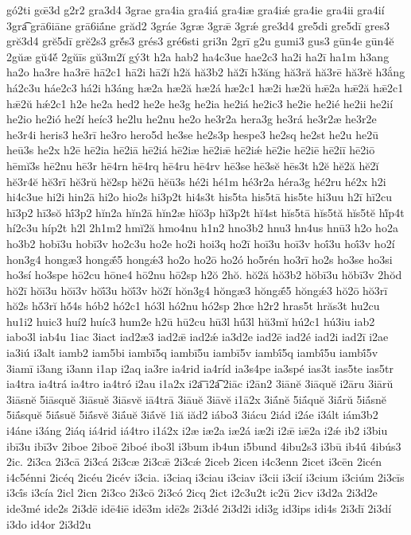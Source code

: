 {gó2ti
gœ̄3d
g2r2
gra3d4
3grae
gra4ia
gra4iá
gra4iæ
gra4iǽ
gra4ie
gra4ii
gra4ií
3gra͡
grā6iāne
grā6iā́ne
grăd2
3gráe
3græ
3grǣ
3grǽ
gre3d4
gre5di
gre5dī
gres3
grĕ3d4
grĕ5dī
grĕ2s3
grĕ́s3
grés3
gré6sti
gri3n
2grī
g2u
gumi3
gus3
gūn4e
gūn4ĕ
2gŭæ
gŭ4ĕ́
2gŭīs
gŭ3m2ĭ
gý3t
h2a
hab2
ha4c3ue
hae2c3
ha2i
ha2ī
ha1m
h3ang
ha2o
ha3re
ha3rē
hā2c1
hā2i
hā2ĭ
h2ă
hă3b2
hă2ī
h3ăng
hă3ră
hă3rē
hă3rĕ
h3ắng
há2c3u
háe2c3
há2i
h3áng
hæ2a
hæ2ă
hæ2á
hæ2c1
hæ2i
hæ2ŭ
hǣ2a
hǣ2ă
hǣ2c1
hǣ2ŭ
hǽ2c1
h2e
he2a
hed2
he2e
he3g
he2ia
he2iá
he2ic3
he2ie
he2ié
he2ii
he2ií
he2io
he2ió
he2í
heíc3
he2lu
he2nu
he2o
he3r2a
hera3g
he3rá
he3r2æ
he3r2e
he3r4i
heris3
he3rī
he3ro
hero5d
he3se
he2s3p
hespe3
he2sq
he2st
he2u
he2ū
heū3s
he2x
h2ē
hē2ia
hē2iā
hē2iá
hē2iæ
hē2iǣ
hē2iǽ
hē2ie
hē2iē
hē2iī
hē2iō
hēmĭ3s
hē2nu
hē3r
hē4rn
hē4rq
hē4ru
hē4rv
hē3se
hē3sĕ
hēs3t
h2ĕ
hĕ2ă
hĕ2ĭ
hĕ3r4ĕ
hĕ3rī
hĕ3rŭ
hĕ2sp
hĕ2ū
hĕū3s
hé2i
hé1m
hé3r2a
héra3g
hé2ru
hé2x
h2i
hi4c3ue
hi2i
hin2ā
hi2o
hio2s
hi3p2t
hi4s3t
his5ta
his5tā
his5te
hi3uu
h2ī
hī2cu
hī3p2
hī3sŏ
hī́3p2
hĭn2a
hĭn2ā
hĭn2æ
hĭŏ3p
hĭ3p2t
hĭ4st
hĭs5tā
hĭs5tă
hĭs5tĕ
hĭ́p4t
hí2c3u
híp2t
h2l
2h1m2
hmĭ2ă
hmo4nu
h1n2
hno3b2
hnu3
hn4us
hnū3
h2o
ho2a
ho3b2
hobī3u
hobī3v
ho2c3u
ho2e
ho2i
hoi3q
ho2ī
hoī3u
hoī3v
hoī́3u
hoī́3v
ho2í
hon3g4
hongæ3
hongǣ́5
hongǽ3
ho2o
ho2ō
ho2ó
ho5rén
ho3rī
ho2s
ho3se
ho3si
ho3sí
ho3spe
hō2cu
hōne4
hō2nu
hō2sp
h2ŏ
2hŏ.
hŏ2ă
hŏ3b2
hŏbī3u
hŏbī3v
2hŏd
hŏ2ī
hŏī3u
hŏī3v
hŏī́3u
hŏī́3v
hŏ2ĭ
hŏn3g4
hŏngæ3
hŏngǣ́5
hŏngǽ3
hŏ2ō
hŏ3rī
hŏ2s
hŏ́3rĭ
hŏ́4s
hób2
hó2c1
hó3l
hó2nu
hó2sp
2hœ
h2r2
hras5t
hrăs3t
hu2cu
hu1i2
huic3
huí2
huíc3
hum2e
h2ū
hū2cu
hū3l
hū́3l
hŭ3mĭ
hú2c1
hú3iu
iab2
iabo3l
iab4u
1iac
3iact
iad2æ3
iad2ǣ
iad2ǽ
ia3d2e
iad2ē
iad2é
iad2i
iad2ī
i2ae
ia3iú
i3alt
iamb2
iam5bi
iambī5q
iambī5u
iambī5v
iambī́5q
iambī́5u
iambī́5v
3iamī
i3ang
i3ann
i1ap
i2aq
ia3re
ia4rid
ia4ríd
ia3s4pe
ia3spé
ias3t
ias5te
ias5tr
ia4tra
ia4trá
ia4tro
ia4tró
i2au
i1a2x
i2a͞
i2a͡
2iāc
i2ān2
3iānĕ
3iāquĕ
i2āru
3iārŭ
3iāsnĕ
5iāsquĕ
3iāsuĕ
3iāsvĕ
iā4trā
3iāuĕ
3iāvĕ
i1ā2x
3iā́nĕ
5iā́quĕ
3iā́rŭ
5iā́snĕ
5iā́squĕ
5iā́suĕ
5iā́svĕ
3iā́uĕ
3iā́vĕ
1iă
iăd2
iábo3
3iácu
2iád
i2áe
i3ált
iám3b2
i4áne
i3áng
2iáq
iá4rid
iá4tro
i1á2x
i2æ
iæ2a
iæ2á
iæ2i
i2ǣ
iǣ2a
i2ǽ
ib2
i3biu
ibī3u
ibī3v
2iboe
2iboē
2iboé
ibo3l
i3bum
ib4un
i5bund
4ibu2s3
i3bū
ib4ū́
4ibús3
2ic.
2i3ca
2i3cā
2i3cá
2i3cæ
2i3cǣ
2i3cǽ
2iceb
2icen
i4c3enn
2icet
i3cēn
2icén
i4c5énni
2icéq
2icéu
2icév
i3cia.
i3ciaq
i3ciau
i3ciav
i3cii
i3cií
i3cium
i3ciúm
2i3cīs
i3cī́s
i3cía
2icl
2icn
2i3co
2i3cō
2i3có
2icq
2ict
i2c3u2t
ic2ū
2icv
i3d2a
2i3d2e
ide3mé
ide2s
2i3dē
idē4iē
idē3m
idē2s
2i3dé
2i3d2i
idi3g
id3ips
idi4s
2i3dī
2i3dí
i3do
id4or
2i3d2u
}
